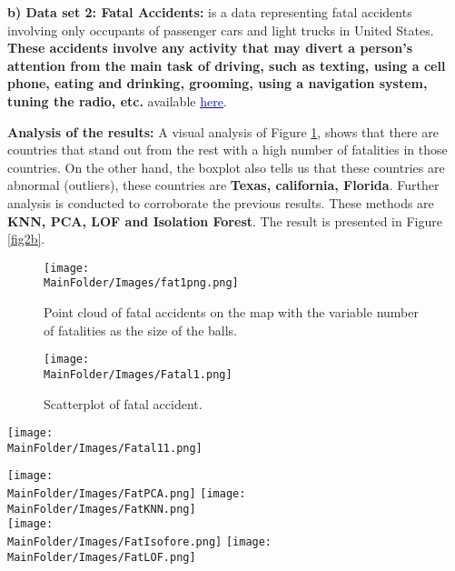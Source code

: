\afterpage{\FloatBarrier}

%
%

\noindent \textbf{b) Data set 2: Fatal Accidents:}
 is a data representing fatal accidents involving only occupants of passenger cars and light trucks in  United States. \textbf{These accidents involve any activity that may divert a person's attention from the main task of driving, such as texting, using a cell phone, eating and drinking, grooming, using a navigation system, tuning the radio, etc.} available  \href{https://www.bts.dot.gov/content/passenger-car-and-light-truck-occupants-killed-and-restraint-use}{\textcolor{blue}{\underline{here}}}. \newl
 
\noindent \textbf{Analysis of the results:}
A visual analysis of Figure \ref{fig2}, shows that there are countries that stand out from the rest with a high number of fatalities in those countries. On the other hand, the boxplot  also tells us that these countries are abnormal (outliers), these countries are \textbf{Texas, california, Florida}. Further analysis is conducted to corroborate the previous results. These methods are \textbf{ KNN, PCA, LOF and Isolation Forest}. The result is presented in Figure \ref{fig2b}. 
\begin{figure}
    \centering
    \texttt{[image: \\MainFolder/Images/fat1png.png]}
    \caption{Point cloud of fatal accidents on the map with the variable number of fatalities as the size of the balls.}%
    \label{fig2}
\end{figure}
%
%

\begin{figure}[H]
    \centering
    \texttt{[image: \\MainFolder/Images/Fatal1.png]}
    \caption{Scatterplot of fatal accident.}%
    \label{fig2a}
\end{figure}

\begin{figure*}[ht!]
 \centering
     \texttt{[image: \\MainFolder/Images/Fatal11.png]}
    \caption{Illustration des performences des méthodes: KNN, PCA, Isolation forest and LOF}%
    \label{fig3}
\end{figure*}

\begin{figure*}[ht]
    \centering
    \texttt{[image: \\MainFolder/Images/FatPCA.png]}
    \texttt{[image: \\MainFolder/Images/FatKNN.png]}\\
    \texttt{[image: \\MainFolder/Images/FatIsofore.png]}
    \texttt{[image: \\MainFolder/Images/FatLOF.png]}
    \caption{Villes qui ont plus d'accidents mortels détectées comme aberrantes par PCA (en haut à gauche), KNN (en haut à droite), Isolation Forest (en bas à gauche) et LOF (en bas à droite)}%
    \label{fig2b}
\end{figure*}


